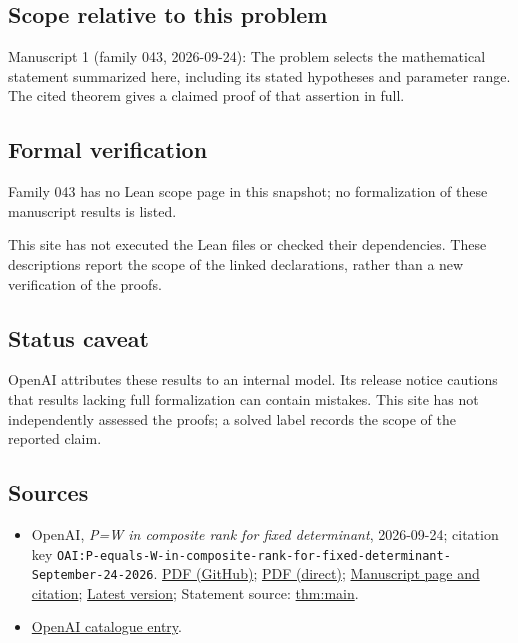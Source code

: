 \documentclass[11pt]{article}
\begin{document}
\subsection{Scope relative to this problem}
Manuscript 1 (family 043, 2026-09-24): The problem selects the mathematical statement summarized here, including its stated hypotheses and parameter range. The cited theorem gives a claimed proof of that assertion in full.

\subsection{Formal verification}
Family 043 has no Lean scope page in this snapshot; no formalization of these manuscript results is listed.

This site has not executed the Lean files or checked their dependencies. These descriptions report the scope of the linked declarations, rather than a new verification of the proofs.

\subsection{Status caveat}
OpenAI attributes these results to an internal model. Its release notice cautions that results lacking full formalization can contain mistakes. This site has not independently assessed the proofs; a solved label records the scope of the reported claim.

\subsection{Sources}
\begin{itemize}
\item OpenAI, \emph{P=W in composite rank for fixed determinant}, 2026-09-24; citation key \texttt{OAI:P-equals-W-in-composite-rank-for-fixed-determinant-September-24-2026}. \href{https://github.com/openai/math/blob/adc7f1241b42e322a6451854ab7e4b4c146bf78a/preprints/P-equals-W-in-composite-rank-for-fixed-determinant-September-24-2026/P-equals-W-in-composite-rank-for-fixed-determinant-September-24-2026.pdf}{PDF (GitHub)}; \href{https://github.com/openai/math/raw/adc7f1241b42e322a6451854ab7e4b4c146bf78a/preprints/P-equals-W-in-composite-rank-for-fixed-determinant-September-24-2026/P-equals-W-in-composite-rank-for-fixed-determinant-September-24-2026.pdf}{PDF (direct)}; \href{https://github.com/openai/math/blob/adc7f1241b42e322a6451854ab7e4b4c146bf78a/preprints/P-equals-W-in-composite-rank-for-fixed-determinant-September-24-2026/README.md}{Manuscript page and citation}; \href{https://github.com/openai/math/blob/main/preprints/P-equals-W-in-composite-rank-for-fixed-determinant-September-24-2026/P-equals-W-in-composite-rank-for-fixed-determinant-September-24-2026.pdf}{Latest version}; Statement source: \href{https://github.com/openai/math/blob/adc7f1241b42e322a6451854ab7e4b4c146bf78a/preprints/P-equals-W-in-composite-rank-for-fixed-determinant-September-24-2026/build/sections/01-introduction.tex\#L39}{thm:main}.
\item \href{https://github.com/openai/math/blob/adc7f1241b42e322a6451854ab7e4b4c146bf78a/CONTENTS.md}{OpenAI catalogue entry}.
\end{itemize}
\end{document}

